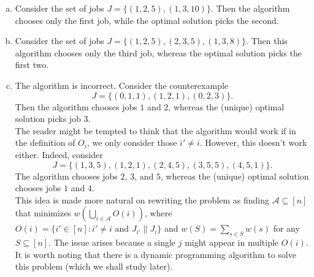 \begin{solution*}
	\begin{enumerate}[(a)]
		\item Consider the set of jobs $J=\{(1,2,5),(1,3,10)\}$. Then the algorithm chooses only the first job, while the optimal solution picks the second.
		
		\item Consider the set of jobs $J=\{(1,2,5),(2,3,5),(1,3,8)\}$. Then this algorithm chooses only the third job, whereas the optimal solution picks the first two.
		
		\item The algorithm is incorrect. Consider the counterexample
		\[ J = \{(0,1,1),(1,2,1),(0,2,3)\}. \]
		Then the algorithm chooses jobs $1$ and $2$, whereas the (unique) optimal solution picks job $3$.\\
		The reader might be tempted to think that the algorithm would work if in the definition of $O_i$, we only consider those $i'\neq i$. However, this doesn't work either. Indeed, consider
		\[ J = \{(1,3,5),(1,2,1),(2,4,5),(3,5,5),(4,5,1)\}. \]
		The algorithm chooses jobs $2$, $3$, and $5$, whereas the (unique) optimal solution chooses jobs $1$ and $4$.\\
		This idea is made more natural on rewriting the problem as finding $\mathcal{A}\subseteq[n]$ that minimizes $w\left(\bigcup_{i\in\mathcal{A}} O(i)\right)$,	where $O(i) = \{i'\in[n] : i'\neq i\text{ and }J_{i'}\|J_i\}$ and $w(S)=\sum_{s\in S}w(s)$ for any $S\subseteq[n]$. The issue arises because a single $j$ might appear in multiple $O(i)$. It is worth noting that there is a dynamic programming algorithm to solve this problem (which we shall study later).
	\end{enumerate}
\end{solution*}

